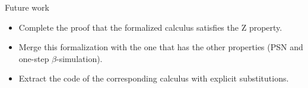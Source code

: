 \documentclass[10pt]{beamer}
\newcommand{\term}{{\mathcal{T}}}
\newcommand{\fv}[1]{{\tt fv}(#1)}
\begin{document}
\begin{frame}[fragile]{Future work}
  \begin{itemize}
  \item Complete the proof that the formalized calculus satisfies the
    Z property.
  \item Merge this formalization with the one that has the other properties (PSN and one-step $\beta$-simulation).
  \item Extract the code of the corresponding calculus with explicit substitutions.
  \end{itemize}
\end{frame}





\end{document}
